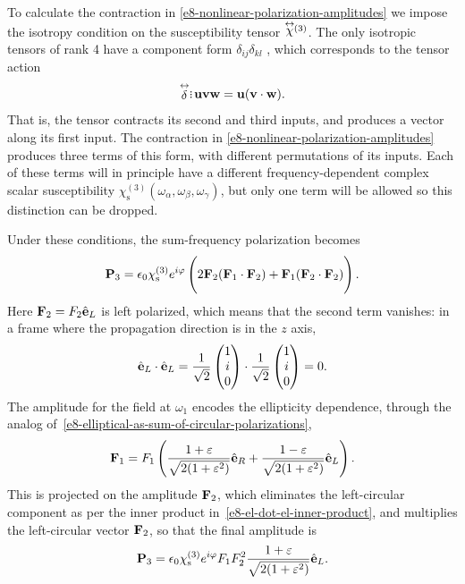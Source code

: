To calculate the contraction in \eqref{e8-nonlinear-polarization-amplitudes} we impose the isotropy condition on the susceptibility tensor $\stackrel{\leftrightarrow}{\chi}\!\!{}^{(3)}$. The only isotropic tensors of rank 4 have a component form $\delta_{ij}\delta_{kl}$ \cite[\S3.03]{JeffreysJeffreys}, which corresponds to the tensor action 
\begin{equation}
\stackrel{\leftrightarrow}{\delta}\, \,\tdots\vb{u}\vb{v}\vb{w}=\vb{u}(\vb{v}\cdot\vb{w}).
\end{equation}
That is, the tensor contracts its second and third inputs, and produces a vector along its first input. The contraction in \eqref{e8-nonlinear-polarization-amplitudes} produces three terms of this form, with different permutations of its inputs. Each of these terms will in principle have a different frequency-dependent complex scalar susceptibility $\chi^{(3)}_\text{s}(\omega_\alpha,\omega_\beta,\omega_\gamma)$, but only one term will be allowed so this distinction can be dropped.





Under these conditions, the sum-frequency polarization becomes
\begin{equation}
\vb{P}_3=\epsilon_0\chi^{(3)}_\text{s} e^{i\varphi} \left(\vphantom{\sum_i}
2\vb{F}_2(\vb{F}_1\cdot\vb{F}_2)+\vb{F}_1(\vb{F}_2\cdot\vb{F}_2)
\right).
\label{e8-nonlinear-polarization-inner-products}
\end{equation}
Here $\vb{F}_2=F_2\hat{\vb{e}}_L$ is left polarized, which means that the second term vanishes: in a frame where the propagation direction is in the $z$ axis,
\begin{equation}
 \hat{\vb{e}}_L\cdot\hat{\vb{e}}_L=
 \frac{1}{\sqrt{2}}\begin{pmatrix}1\\i\\0\end{pmatrix}
 \cdot
 \frac{1}{\sqrt{2}}\begin{pmatrix}1\\i\\0\end{pmatrix}
 =0.
\label{e8-el-dot-el-inner-product}
\end{equation}
The amplitude for the field at $\omega_1$ encodes the ellipticity dependence, through the analog of~\eqref{e8-elliptical-as-sum-of-circular-polarizations},
\begin{equation}
 \vb{F}_1=
 F_1
 \left(
 \frac{1+\varepsilon}{\sqrt{2(1+\varepsilon^2)}}\hat{\vb{e}}_R
 +
  \frac{1-\varepsilon}{\sqrt{2(1+\varepsilon^2)}}\hat{\vb{e}}_L
 \right).
 \label{e8-elliptical-driver-polarization-decomposition}
\end{equation}
This is projected on the amplitude $\vb{F}_2$, which eliminates the left-circular component as per the inner product in~\eqref{e8-el-dot-el-inner-product}, and multiplies the left-circular vector $\vb{F}_2$, so that the final amplitude is
\begin{equation}
\vb{P}_3=\epsilon_0\chi^{(3)}_\text{s} e^{i\varphi} F_1F_2^2 \frac{1+\varepsilon}{\sqrt{2(1+\varepsilon^2)}}\hat{\vb{e}}_L.
\label{e8-nonlinear-polarization-final-result}
\end{equation}





